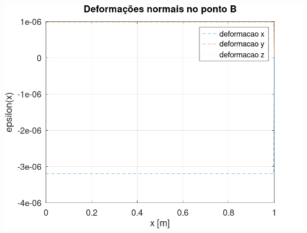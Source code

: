\documentclass[10pt]{article}
\begin{document}
\begin{center}
    \includegraphics[scale=0.25]{figure24.png}

\end{center}
\end{document}
